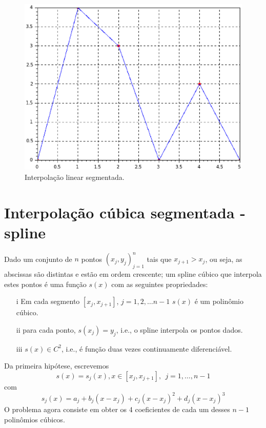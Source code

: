 \begin{figure}[htp]
\begin{center}
\includegraphics[scale=0.5]{./cap_aproxfun/pics/interpolacao_linear_segmentada.eps}
\caption{Interpolação linear segmentada.}
\label{fig:linear_segmentada}
\end{center}
\end{figure}


\section{Interpolação cúbica segmentada - spline}
Dado um conjunto de $n$ pontos $\left(x_j,y_j\right)_{j=1}^n$ tais que $x_{j+1}>x_j$, ou seja, as abscissas são distintas e estão em ordem crescente; um spline cúbico que interpola estes pontos é uma função $s(x)$ com as seguintes propriedades:
\begin{itemize}
\item[i] Em cada segmento $[x_j,x_{j+1}]$, $j=1,2,\ldots n-1$ $s(x)$ é um polinômio cúbico.
\item[ii] para cada ponto, $s(x_j)=y_j$, i.e., o spline interpola os pontos dados.
\item[iii] $s(x)\in C^2$, i.e., é função duas vezes continuamente diferenciável.
\end{itemize}

Da primeira hipótese, escrevemos
$$s(x)=s_j(x),x \in [x_j,x_{j+1}],~~ j=1,\ldots, n-1$$
com
$$s_j(x)=a_j+b_j(x-x_j)+c_j(x-x_j)^2+d_j(x-x_j)^3$$
O problema agora consiste em obter os 4 coeficientes de cada um desses $n-1$ polinômios cúbicos.


